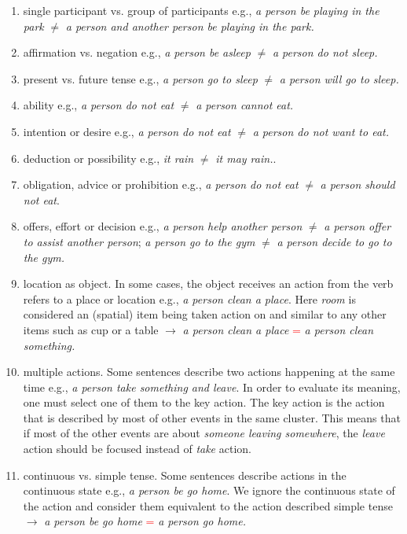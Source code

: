 \begin{enumerate}
    \item single participant vs. group of participants e.g., \emph{a person be playing in the park} $\ne$ \emph{a person and another person be playing in the park.}
    
    \item affirmation vs. negation e.g., \emph{a person be asleep}  $\ne$ \emph{a person do not sleep.}

    \item present vs. future tense e.g., \emph{a person go to sleep} $\ne$ \emph{a person will go to sleep.}

    \item ability e.g., \emph{a person do not eat} $\ne$ \emph{a person cannot eat.}

    \item intention or desire e.g., \emph{a person do not eat} $\ne$ \emph{a person do not want to eat.}

    \item deduction or possibility e.g., \emph{it rain} $\ne$ \emph{it may rain.}. 
    
    \item obligation, advice or prohibition	e.g., \emph{a person do not eat} $\ne$ \emph{a person should not eat}.

    \item offers, effort or decision e.g., \emph{a person help another person} $\ne$ \emph{a person offer to assist another person}; \emph{a person go to the gym} $\ne$ \emph{a person decide to go to the gym.}

    \item location as object. In some cases, the object receives an action from the verb refers to a place or location e.g., \emph{a person clean a place}. Here \textit{room} is considered an (spatial) item being taken action on and similar to any other items such as cup or a table $\rightarrow$ \emph{a person clean a place} \textcolor{red}{=} \emph{a person clean something.}

    \item multiple actions. Some sentences describe two actions happening at the same time e.g., \emph{a person take something and leave}. In order to evaluate its meaning, one  must select one of them to the key action. The key action is the action that is described by most of other events in the same cluster. This means that if most of the other events are about \textit{someone leaving somewhere}, the \textit{leave} action should be focused instead of \textit{take} action. 

    \item continuous vs. simple tense. Some sentences describe actions in the continuous state e.g., \emph{a person be go home}. We ignore the continuous state of the action and consider them equivalent to the action described simple tense $\rightarrow$  \emph{a person be go home} \textcolor{red}{=} \emph{a person go home.}	
\end{enumerate}

